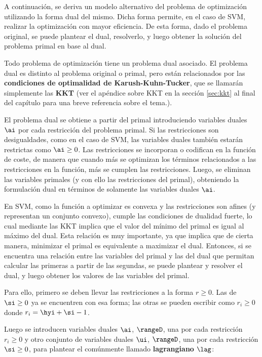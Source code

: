 
A continuación, se deriva un modelo alternativo del problema de optimización utilizando la forma dual del mismo. Dicha forma permite, en el caso de SVM, realizar la optimización con mayor eficiencia. De esta forma, dado el problema original, se puede plantear el dual, resolverlo, y luego obtener la solución del problema primal en base al dual.

Todo problema de optimización tiene un problema dual asociado. El problema dual es distinto al problema original o primal, pero están relacionados por las \textbf{condiciones de optimalidad de Karush-Kuhn-Tucker}, que se llamarán simplemente las \textbf{KKT} (ver el apéndice sobre KKT en la sección \ref{sec:kkt} al final del capítulo para una breve referencia sobre el tema.). 

El problema dual se obtiene a partir del primal introduciendo variables duales $\ai$ por cada restricción del problema primal. Si las restricciones son desigualdades, como en el caso de SVM, las variables duales también estarán restrictas como $\ai \geq 0$. Las restricciones se incorporan o codifican en la función de coste, de manera que cuando más se optimizan los términos relacionados a las restricciones en la función, más se cumplen las restricciones. Luego, se eliminan las variables primales (y con ello las restricciones del primal), obteniendo la formulación dual en términos de solamente las variables duales $\ai$. 

En SVM, como la función a optimizar es convexa y las restricciones son afines (y representan un conjunto convexo), cumple las condiciones de dualidad fuerte, lo cual mediante las KKT implica que el valor del mínimo del primal es igual al máximo del dual. Esta relación es muy importante, ya que implica que de cierta manera, minimizar el primal es equivalente a maximizar el dual. Entonces, si se encuentra una relación entre las variables del primal y las del dual que permitan calcular las primeras a partir de las segundas, se puede plantear y resolver el dual, y luego obtener los valores de las variables del primal. 

Para ello, primero se deben llevar las restricciones a la forma $ r \geq 0$. Las de $\si \geq 0 $ ya se encuentren con esa forma; las otras se pueden escribir como $r_i \geq 0$ donde $r_i = \hyi +\si - 1$. 

Luego se introducen variables duales $\ai$, $\rangeD$, una por cada restricción $r_i \geq 0$ y otro conjunto de variables duales $\ui$, $\rangeD$, una por cada restricción $\si \geq 0$, para plantear el comúnmente llamado \textbf{lagrangiano} $\lag$:


